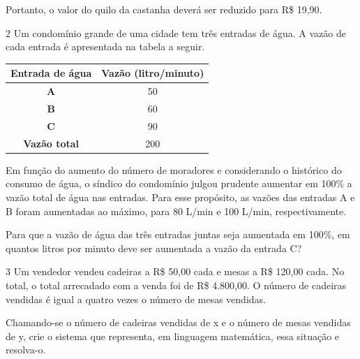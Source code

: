 \begin{escolha}
{{{Portanto, o valor do quilo da castanha deverá ser reduzido para R\$ 19,90.

\num{2} Um condomínio grande de uma cidade tem três entradas de água. A
vazão de cada entrada é apresentada na tabela a seguir.

\begin{table}[]
\begin{tabular}{|cc}
\hline
\textbf{Entrada de água} & \multicolumn{1}{c|}{\textbf{Vazão (litro/minuto)}} \\ \hline
\textbf{A} & 50 \\ \hline
\textbf{B} & 60 \\ \hline
\textbf{C} & 90 \\ \hline
\textbf{Vazão total} & 200 \\ \hline
\end{tabular}
\end{table}

Em função do aumento do número de moradores e considerando o histórico
do consumo de água, o síndico do condomínio julgou prudente aumentar em
100\% a vazão total de água nas entradas. Para esse propósito,
as vazões das entradas A e B foram aumentadas ao máximo, para 80 L/min e
100 L/min, respectivamente.

Para que a vazão de água das três entradas juntas seja aumentada em
100\%, em quantos litros por minuto deve ser aumentada a vazão da entrada C?



\num{3} Um vendedor vendeu cadeiras a R\$ 50,00 cada e mesas a R\$ 120,00
cada. No total, o total arrecadado com a venda foi de R\$ 4.800,00. O número 
de cadeiras vendidas é igual a quatro vezes o número de mesas vendidas.

Chamando-se o número de cadeiras vendidas de x e o número de mesas
vendidas de y, crie o sistema que representa, em linguagem
matemática, essa situação e resolva-o.


\coment{

}}}}
\end{escolha}
